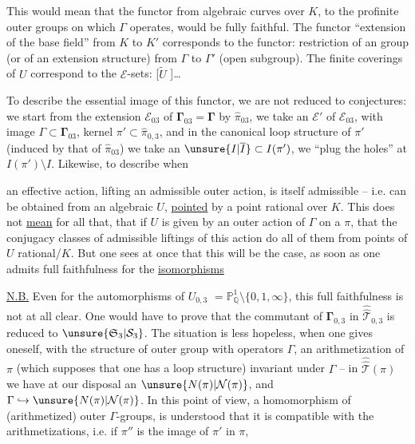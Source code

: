 This would mean that the functor from algebraic
curves over $K$, to the profinite outer groups
on which $\Gamma$ operates, would be fully faithful.
The functor ``extension of the base field'' from
$K$ to $K'$ corresponds to the functor: restriction
of an  group (or of an extension
structure) from $\Gamma$ to $\Gamma'$ (open subgroup).
The finite  coverings of $U$ correspond to the
$\mathcal E$-sets: [$\widetilde U$ ]\ldots

To describe the essential image of this
functor, we are not reduced to conjectures:
we start from the  extension $\mathcal E_{03}$ of $\boldsymbol{\Gamma}_{03}=\boldsymbol{\Gamma}$
by $\widehat{\pi}_{03}$, we take an   $\mathcal E'$
of $\mathcal E_{03}$, with image $\Gamma\subset\boldsymbol{\Gamma}_{03}$, kernel
$\pi'\subset\widehat{\pi}_{0,3}$, and in the canonical loop
structure of $\pi'$ (induced by that of $\widehat{\pi}_{03}$)
we take an $\unsure{I|\overline I}\subset I(\pi')$,  we ``plug the holes''
at $I(\pi')\setminus I$. Likewise, to describe when

an effective action, lifting an admissible outer
action, is itself admissible -- 
i.e. can be obtained from an algebraic 
$U$, \uline{pointed} by a point rational over $K$.
This does not \uline{mean} for all that, that if
$U$ is given by an outer action of $\Gamma$ on a $\pi$,
that the conjugacy classes of admissible liftings
of this action do  all of them from
points of $U$ rational/$K$. But one sees at once that
this will be the case, as soon as one admits
full faithfulness for the \uline{isomorphisms}

\uline{N.B.} Even for the automorphisms of $U_{0,3}$
$=\mathbb P^1_{\mathbb Q}\setminus\{0,1,\infty\}$, this full faithfulness is not
at all clear. One would have to prove that 
the commutant of $\boldsymbol{\Gamma}_{0,3}$ in $\widehat{\widehat{\mathcal T}}_{0,3}$ is reduced
to $\unsure{\mathfrak S_3|\mathcal S_3}$. The situation is less hopeless,
when one gives oneself, with the structure of
 outer group with operators $\Gamma$, an arithmetization
of $\pi$ (which supposes that one has 
a loop structure) invariant under  $\Gamma$
--  in $\widehat{\widehat{\mathcal T}}(\pi)$ we have at our disposal an $\unsure{N(\pi)|\mathcal N(\pi)}$,
and $\Gamma\hookrightarrow\unsure{N(\pi)|\mathcal N(\pi)}$. In this point of view,  a
homomorphism  of (arithmetized) outer $\Gamma$-groups,
 is understood that it is compatible with
the arithmetizations, i.e. if $\pi''$ is the image of $\pi'$ in $\pi$,

